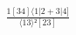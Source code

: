 \documentclass[varwidth, border=5pt]{standalone}
\begin{document}
\begin{my}
$\begin{gathered}
\scriptscriptstyle\frac{1[34]⟨1|2+3|4]}{⟨13⟩²[23]}
\end{gathered}$
\end{my}
\end{document}

